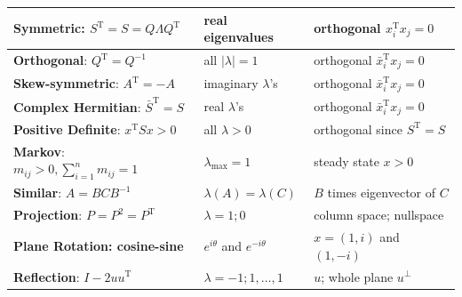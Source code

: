 \documentclass[14pt, a4paper]{article}
\begin{document}
\noindent
\renewcommand{\arraystretch}{1.4} %
\begin{tabular}{|l|l|l|}
    \hline
    \textbf{Symmetric}: $S^{\mathrm{T}} = S = Q\Lambda Q^{\mathrm{T}}$ & real eigenvalues                                & orthogonal $x_i^{\mathrm{T}}x_j = 0$                                       \\ \hline
    \textbf{Orthogonal}: $Q^{\mathrm{T}} = Q^{-1}$                     & all $|\lambda| = 1$                             & orthogonal $\bar{x}_i^{\mathrm{T}}x_j = 0$                                 \\ \hline
    \textbf{Skew-symmetric}: $A^{\mathrm{T}} = -A$                     & imaginary $\lambda$'s                           & orthogonal $\bar{x}_i^{\mathrm{T}}x_j = 0$                                 \\ \hline
    \textbf{Complex Hermitian}: $\bar{S}^{\mathrm{T}} = S$             & real $\lambda$'s                                & orthogonal $\bar{x}_i^{\mathrm{T}}x_j = 0$                                 \\ \hline
    \textbf{Positive Definite}: $x^{\mathrm{T}}Sx > 0$                 & all $\lambda > 0$                               & orthogonal since $S^{\mathrm{T}} = S$                                      \\ \hline
    \textbf{Markov}: $m_{ij} > 0, \sum_{i=1}^n m_{ij} = 1$             & $\lambda_{\max} = 1$                            & steady state $x > 0$                                                       \\ \hline
    \textbf{Similar}: $A = BCB^{-1}$                                   & $\lambda(A) = \lambda(C)$                       & $B$ times eigenvector of $C$                                               \\ \hline
    \textbf{Projection}: $P = P^2 = P^{\mathrm{T}}$                    & $\lambda = 1; 0$                                & column space; nullspace                                                    \\ \hline
    \textbf{Plane Rotation: cosine-sine}                               & $e^{i\theta}$ and $e^{-i\theta}$                & $x = (1, i)$ and $(1, -i)$                                                 \\ \hline
    \textbf{Reflection}: $I - 2uu^{\mathrm{T}}$                        & $\lambda = -1; 1, \dots, 1$                     & $u$; whole plane $u^{\perp}$                                               \\ \hline

\end{tabular}
\end{document}
